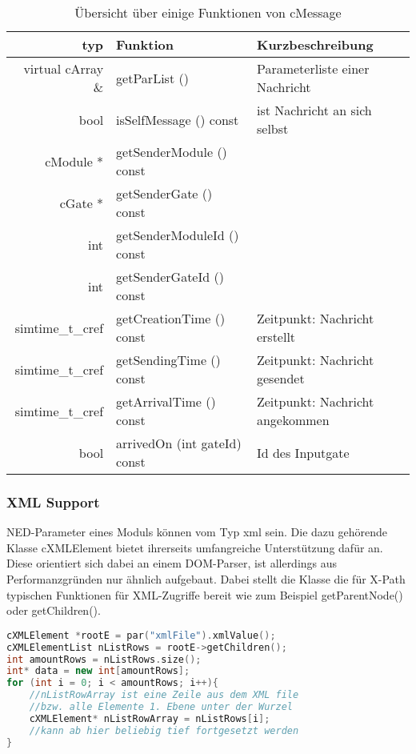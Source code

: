 \begin{table}[!ht]
  \centering
  \caption{Übersicht über einige Funktionen von cMessage}
\begin{tabularx}{\textwidth}{rll}
	\toprule
	typ & Funktion & Kurzbeschreibung\\
	\midrule	
	virtual cArray \& & getParList () & Parameterliste einer Nachricht\\
	bool 	& isSelfMessage () const & ist Nachricht an sich selbst\\
	cModule * 	& getSenderModule () const &  \\
	cGate * 	& getSenderGate () const  & \\
	int &	getSenderModuleId () const & \\
	int &	getSenderGateId () const & \\
	simtime\_t\_cref 	& getCreationTime () const & Zeitpunkt: Nachricht erstellt\\
	simtime\_t\_cref 	& getSendingTime () const & Zeitpunkt: Nachricht gesendet\\
	simtime\_t\_cref 	& getArrivalTime () const  & Zeitpunkt: Nachricht angekommen\\
	bool &	arrivedOn (int gateId) const & Id des Inputgate\\
	\bottomrule
\end{tabularx}
\end{table}

\subsubsection{XML Support}

NED-Parameter eines Moduls können vom Typ xml sein. Die dazu gehörende Klasse cXMLElement bietet ihrerseits umfangreiche Unterstützung dafür an. Diese orientiert sich dabei an einem DOM-Parser, ist allerdings aus Performanzgründen nur ähnlich aufgebaut. Dabei stellt die Klasse die für X-Path typischen Funktionen für XML-Zugriffe bereit wie zum Beispiel getParentNode() oder getChildren().

\begin{minipage}{\textwidth}
\begin{lstlisting}[language=C++,caption={Beispiel einlesen von XML},label=lst:xml]
cXMLElement *rootE = par("xmlFile").xmlValue();
cXMLElementList nListRows = rootE->getChildren();
int amountRows = nListRows.size();
int* data = new int[amountRows];
for (int i = 0; i < amountRows; i++){
    //nListRowArray ist eine Zeile aus dem XML file 
    //bzw. alle Elemente 1. Ebene unter der Wurzel
    cXMLElement* nListRowArray = nListRows[i];
    //kann ab hier beliebig tief fortgesetzt werden
}
\end{lstlisting}
\end{minipage}

